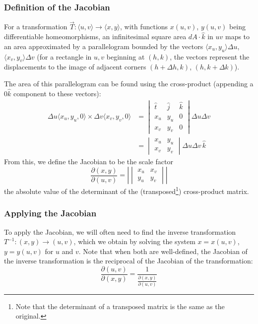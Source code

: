 \documentclass{article}
\newcommand{\vect}[1]{\ensuremath{\overrightarrow{#1}}}
\begin{document}
\subsubsection{Definition of the Jacobian}
For a transformation $\vect{T}: \langle u,v \rangle\to\langle x,y \rangle$, with functions $x(u,v)$, $y(u,v)$ being differentiable homeomorphisms, an infinitesimal square area $dA\cdot\hat{k}$ in $uv$ maps to an area approximated by a parallelogram bounded by the vectors $\langle x_u, y_u\rangle\Delta u$, $\langle x_v, y_v\rangle\Delta v$ (for a rectangle in $u,v$ beginning at $(h,k)$, the vectors represent the displacements to the image of adjacent corners $(h+\Delta h,k)$, $(h,k+\Delta k)$).

The area of this parallelogram can be found using the cross-product (appending a $0 \hat{k}$ component to these vectors):
\begin{align*}
\Delta u \langle x_u, y_u,0\rangle\times \Delta v \langle x_v, y_v, 0\rangle &=
\begin{vmatrix}
\hat{t} & \hat{j} & \hat{k}\\
x_u & y_u & 0 \\
x_v & y_v & 0
\end{vmatrix}\Delta u\Delta v \\ &=
\begin{vmatrix}
    x_u & y_u \\
    x_v & y_v
\end{vmatrix}\Delta u \Delta v\,\hat{k}
\end{align*}
From this, we define the Jacobian to be the scale factor
$$\frac{\partial(x,y)}{\partial(u,v)}=\left|\begin{vmatrix}
    x_u & x_v\\
    y_u & y_v
\end{vmatrix}\right|$$
the absolute value of the determinant of the (transposed\footnote{Note that the determinant of a transposed matrix is the same as the original.}) cross-product matrix.

\subsubsection{Applying the Jacobian}
To apply the Jacobian, we will often need to find the inverse transformation $T^{-1}: (x,y)\to(u,v)$, which we obtain by solving the system $x=x(u,v)$, $y=y(u,v)$ for $u$ and $v$. Note that when both are well-defined, the Jacobian of the inverse transformation is the reciprocal of the Jacobian of the transformation: $$\frac{\partial(u,v)}{\partial(x,y)}=\frac{1}{\frac{\partial(x,y)}{\partial(u,v)}}$$
\end{document}
